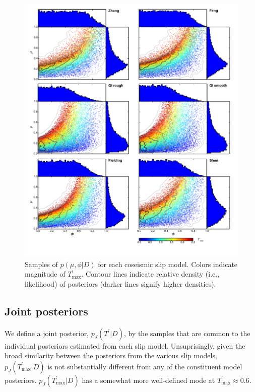 \documentclass[twocolumn,jgrga]{AGUTeX}
\begin{document}
\begin{article}
\begin{figure}[htbp]
\centering
\includegraphics[width=40pc]{../figures/mu_phi_fms.pdf}
\caption{Samples of $p(\mu,\phi | D)$ for each coseismic slip model.
Colors indicate magnitude of $T^\prime_{\mathrm{max}}$. Contour lines
indicate relative density (i.e., likelihood) of posteriors (darker lines
signify higher densities).}
\label{fig:mu_phi_scatters}
\end{figure}

\subsection{Joint posteriors}\label{joint-posteriors}

We define a joint posterior, $p_{J}(T^\prime | D)$, by the samples that 
are common to the individual posteriors estimated from each slip model.
Unsuprisingly, given the broad similarity between the posteriors from
the various slip models, $p_{J}(T^\prime_{\mathrm{max}} | D)$ is not
substantially different from any of the constituent model posteriors.
$p_{J}(T^\prime_{\mathrm{max}} | D)$ has a somewhat more well-defined
mode at $T^\prime_{\mathrm{max}} \approx 0.6$.


\end{article}
\end{document}
